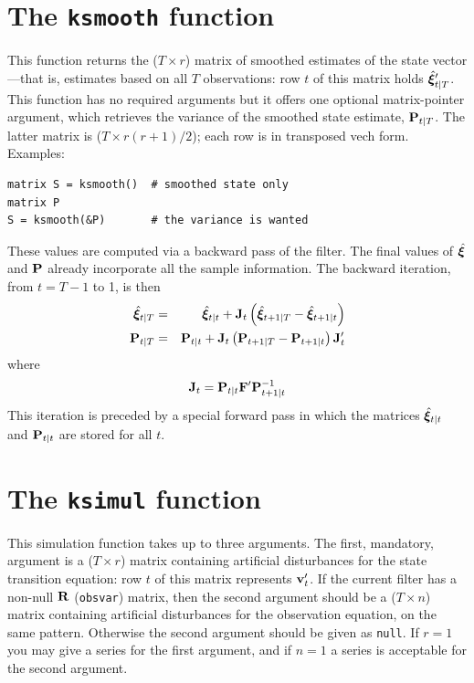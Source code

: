 \documentclass[a4paper]{article}
\newcommand{\obsvar}{\ensuremath\mathbf{R}}
\newcommand{\statevec}{\ensuremath\mathbf{\bm \xi}}
\newcommand{\statemat}{\ensuremath\mathbf{F}}
\newcommand{\strdist}{\ensuremath\mathbf{v}}
\newcommand{\statevar}{\ensuremath\mathbf{P}}
\begin{document}
\section{The \texttt{ksmooth} function}

This function returns the ($T \times r$) matrix of smoothed estimates
of the state vector---that is, estimates based on all $T$
observations: row $t$ of this matrix holds $\hat{\statevec}_{t|T}'$.  This
function has no required arguments but it offers one optional
matrix-pointer argument, which retrieves the variance of the smoothed
state estimate, $\statevar_{t|T}$.  The latter matrix is ($T \times
r(r+1)/2$); each row is in transposed vech form.  Examples:
%
\begin{verbatim}
matrix S = ksmooth()  # smoothed state only
matrix P
S = ksmooth(&P)       # the variance is wanted
\end{verbatim}

These values are computed via a backward pass of the filter.  The
final values of $\hat{\statevec}$ and $\statevar$ already incorporate
all the sample information.  The backward iteration, from $t=T-1$ to
1, is then
%
\begin{eqnarray*}
\hat{\statevec}_{t|T} &=& \hat{\statevec}_{t|t} + 
  \mathbf{J}_t\left(\hat{\statevec}_{t+1|T} - \hat{\statevec}_{t+1|t}\right) \\
\statevar_{t|T} &=& \statevar_{t|t} + 
  \mathbf{J}_t\left(\statevar_{t+1|T} - \statevar_{t+1|t}\right) \mathbf{J}_t'
\end{eqnarray*}
%
where
\[
\mathbf{J}_t = \statevar_{t|t} \statemat' \statevar_{t+1|t}^{-1}
\]
%
This iteration is preceded by a special forward pass in which the
matrices $\hat{\statevec}_{t|t}$ and $\statevar_{t|t}$ are stored
for all $t$.


\section{The \texttt{ksimul} function}

This simulation function takes up to three arguments.  The first,
mandatory, argument is a ($T \times r$) matrix containing artificial
disturbances for the state transition equation: row $t$ of this matrix
represents $\strdist_t'$.  If the current filter has a non-null
$\obsvar$ (\texttt{obsvar}) matrix, then the second argument should be
a ($T \times n$) matrix containing artificial disturbances for the
observation equation, on the same pattern.  Otherwise the second
argument should be given as \texttt{null}.  If $r=1$ you may give a
series for the first argument, and if $n=1$ a series is acceptable for
the second argument.
\end{document}

